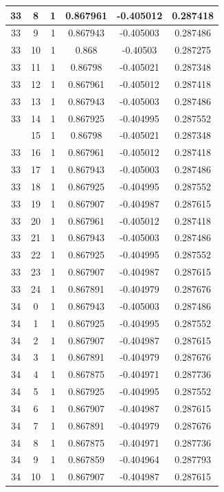 \documentclass[12pt,a4paper]{article}
\numberwithin{equation}{section}
\numberwithin{figure}{section}
\numberwithin{table}{section}
\begin{document}
\begin{longtable}{|c|c|c|c|c|c|}
33 & 8 & 1 & 0.867961 & -0.405012 & 0.287418 \\ \hline
33 & 9 & 1 & 0.867943 & -0.405003 & 0.287486 \\ \hline
33 & 10 & 1 & 0.868 & -0.40503 & 0.287275 \\ \hline
33 & 11 & 1 & 0.86798 & -0.405021 & 0.287348 \\ \hline
33 & 12 & 1 & 0.867961 & -0.405012 & 0.287418 \\ \hline
33 & 13 & 1 & 0.867943 & -0.405003 & 0.287486 \\ \hline
33 & 14 & 1 & 0.867925 & -0.404995 & 0.287552 \\ \hline
\pagebreak
33 & 15 & 1 & 0.86798 & -0.405021 & 0.287348 \\ \hline
33 & 16 & 1 & 0.867961 & -0.405012 & 0.287418 \\ \hline
33 & 17 & 1 & 0.867943 & -0.405003 & 0.287486 \\ \hline
33 & 18 & 1 & 0.867925 & -0.404995 & 0.287552 \\ \hline
33 & 19 & 1 & 0.867907 & -0.404987 & 0.287615 \\ \hline
33 & 20 & 1 & 0.867961 & -0.405012 & 0.287418 \\ \hline
33 & 21 & 1 & 0.867943 & -0.405003 & 0.287486 \\ \hline
33 & 22 & 1 & 0.867925 & -0.404995 & 0.287552 \\ \hline
33 & 23 & 1 & 0.867907 & -0.404987 & 0.287615 \\ \hline
33 & 24 & 1 & 0.867891 & -0.404979 & 0.287676 \\ \hline
34 & 0 & 1 & 0.867943 & -0.405003 & 0.287486 \\ \hline
34 & 1 & 1 & 0.867925 & -0.404995 & 0.287552 \\ \hline
34 & 2 & 1 & 0.867907 & -0.404987 & 0.287615 \\ \hline
34 & 3 & 1 & 0.867891 & -0.404979 & 0.287676 \\ \hline
34 & 4 & 1 & 0.867875 & -0.404971 & 0.287736 \\ \hline
34 & 5 & 1 & 0.867925 & -0.404995 & 0.287552 \\ \hline
34 & 6 & 1 & 0.867907 & -0.404987 & 0.287615 \\ \hline
34 & 7 & 1 & 0.867891 & -0.404979 & 0.287676 \\ \hline
34 & 8 & 1 & 0.867875 & -0.404971 & 0.287736 \\ \hline
34 & 9 & 1 & 0.867859 & -0.404964 & 0.287793 \\ \hline
34 & 10 & 1 & 0.867907 & -0.404987 & 0.287615 \\ \hline

\end{longtable}
\end{document}
